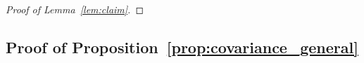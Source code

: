 \documentclass{article}
\begin{document}
\begin{proof}[Proof of Lemma~\ref{lem:claim}]
             
            \end{proof}            
                       




\subsection{Proof of Proposition~\ref{prop:covariance_general}}
    
\end{document}
